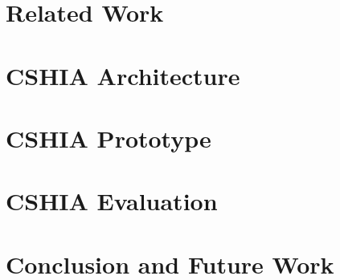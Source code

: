\documentclass[Ingles,Final]{ic-tese-v3}
\begin{document}
\chapter{Related Work}
\label{chap:related_work}


\chapter{CSHIA  Architecture}
\label{chap:cshia_architecture}


\chapter{CSHIA  Prototype}
\label{chap:cshia_prototype}


\chapter{CSHIA  Evaluation}
\label{chap:cshia:evaluation}


\chapter{Conclusion and Future Work}
\label{chap:conclusion}
 





\appendix

%     
% 
\end{document}
